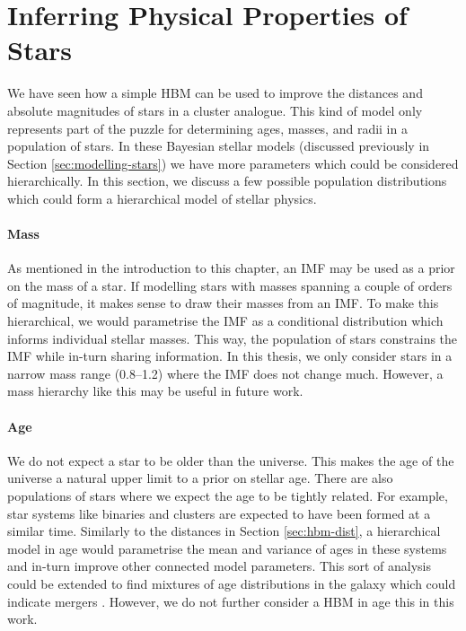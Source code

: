 \section[Stellar Properties]{Inferring Physical Properties of Stars}\label{sec:hbm-phys}

We have seen how a simple HBM can be used to improve the distances and absolute magnitudes of stars in a cluster analogue. This kind of model only represents part of the puzzle for determining ages, masses, and radii in a population of stars. In these Bayesian stellar models (discussed previously in Section \ref{sec:modelling-stars}) we have more parameters which could be considered hierarchically. In this section, we discuss a few possible population distributions which could form a hierarchical model of stellar physics.

\paragraph{Mass} As mentioned in the introduction to this chapter, an IMF may be used as a prior on the mass of a star. If modelling stars with masses spanning a couple of orders of magnitude, it makes sense to draw their masses from an IMF. To make this hierarchical, we would parametrise the IMF as a conditional distribution which informs individual stellar masses. This way, the population of stars constrains the IMF while in-turn sharing information. In this thesis, we only consider stars in a narrow mass range (\SIrange{0.8}{1.2}{\solarmass}) where the IMF does not change much. However, a mass hierarchy like this may be useful in future work.

\paragraph{Age} We do not expect a star to be older than the universe. This makes the age of the universe a natural upper limit to a prior on stellar age. There are also populations of stars where we expect the age to be tightly related. For example, star systems like binaries and clusters are expected to have been formed at a similar time. Similarly to the distances in Section \ref{sec:hbm-dist}, a hierarchical model in age would parametrise the mean and variance of ages in these systems and in-turn improve other connected model parameters. This sort of analysis could be extended to find mixtures of age distributions in the galaxy which could indicate mergers \citep[e.g. \emph{Gaia}-Enceladus;][]{Helmi.Babusiaux.ea2018}. However, we do not further consider a HBM in age this in this work.

